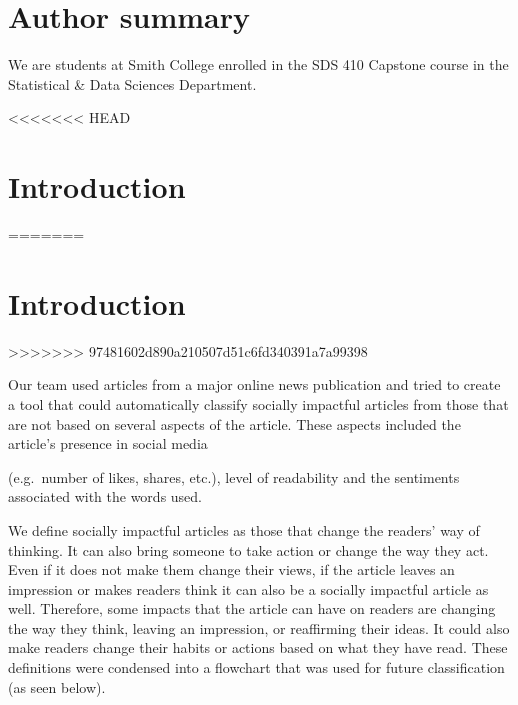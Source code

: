 \documentclass[10pt,letterpaper]{article}
\begin{document}
\section*{Author summary}

We are students at Smith College enrolled in the SDS 410 Capstone course
in the Statistical \& Data Sciences Department.


\linenumbers

<<<<<<< HEAD
\section{Introduction}\label{introduction}
=======
\hypertarget{introduction}{%
\section{Introduction}\label{introduction}}
>>>>>>> 97481602d890a210507d51c6fd340391a7a99398

Our team used articles from a major online news publication and tried to
create a tool that could automatically classify socially impactful
articles from those that are not based on several aspects of the
article. These aspects included the article's presence in social media

(e.g.~number of likes, shares, etc.), level of readability and the
sentiments associated with the words used.

We define socially impactful articles as those that change the readers'
way of thinking. It can also bring someone to take action or change the
way they act. Even if it does not make them change their views, if the
article leaves an impression or makes readers think it can also be a
socially impactful article as well. Therefore, some impacts that the
article can have on readers are changing the way they think, leaving an
impression, or reaffirming their ideas. It could also make readers
change their habits or actions based on what they have read. These
definitions were condensed into a flowchart that was used for future
classification (as seen below).
\end{document}
